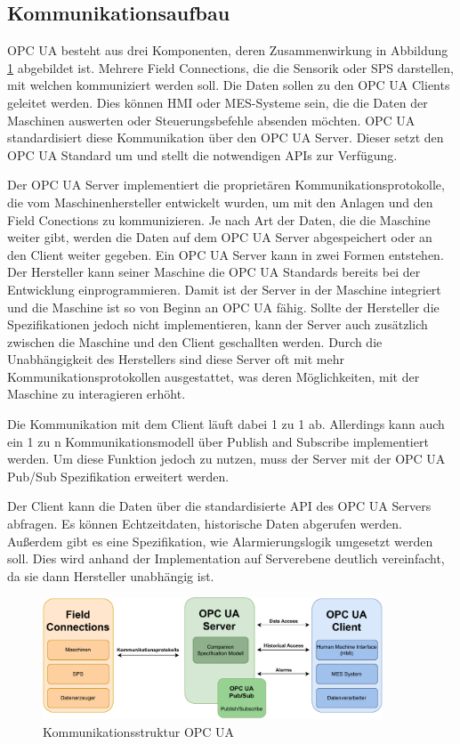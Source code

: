 \documentclass[a4paper, 12pt, oneside]{scrbook}
\begin{document}
		\subsection{Kommunikationsaufbau} 
		
		OPC UA besteht aus drei Komponenten, deren Zusammenwirkung in Abbildung \ref{fig:OPCUA_Structure} abgebildet ist. Mehrere Field Connections, die die Sensorik oder SPS darstellen, mit welchen kommuniziert werden soll. Die Daten sollen zu den OPC UA Clients geleitet werden. Dies können \ac{HMI} oder MES-Systeme sein, die die Daten der Maschinen auswerten oder Steuerungsbefehle absenden möchten. OPC UA standardisiert diese Kommunikation über den OPC UA Server. Dieser setzt den OPC UA Standard um und stellt die notwendigen APIs zur Verfügung. \cite{rinke_was_2022}
		
		Der OPC UA Server implementiert die proprietären Kommunikationsprotokolle, die vom Maschinenhersteller entwickelt wurden, um mit den Anlagen und den Field Conections zu kommunizieren. Je nach Art der Daten, die die Maschine weiter gibt, werden die Daten auf dem OPC UA Server abgespeichert oder an den Client weiter gegeben. Ein OPC UA Server kann in zwei Formen entstehen. Der Hersteller kann seiner Maschine die OPC UA Standards bereits bei der Entwicklung einprogrammieren. Damit ist der Server in der Maschine integriert und die Maschine ist so von Beginn an OPC UA fähig. Sollte der Hersteller die Spezifikationen jedoch nicht implementieren, kann der Server auch zusätzlich zwischen die Maschine und den Client geschallten werden. Durch die Unabhängigkeit des Herstellers sind diese Server oft mit mehr Kommunikationsprotokollen ausgestattet, was deren Möglichkeiten, mit der Maschine zu interagieren erhöht. \cite{rinke_was_2022}
		
		Die Kommunikation mit dem Client läuft dabei 1 zu 1 ab. Allerdings kann auch ein 1 zu n Kommunikationsmodell über Publish and Subscribe implementiert werden. Um diese Funktion jedoch zu nutzen, muss der Server mit der OPC UA Pub/Sub Spezifikation erweitert werden. \cite{mielebacher_verteilte_2021}
		
		Der Client kann die Daten über die standardisierte API des OPC UA Servers abfragen. Es können Echtzeitdaten, historische Daten abgerufen werden. Außerdem gibt es eine Spezifikation, wie Alarmierungslogik umgesetzt werden soll. Dies wird anhand der Implementation auf Serverebene deutlich vereinfacht, da sie dann Hersteller unabhängig ist. \cite{rinke_was_2022}
		
		\begin{figure}[H]
			\centering
			\includegraphics[width=0.9\textwidth]{res/diagramms/OPCUA.pdf}
			\caption{Kommunikationsstruktur OPC UA}
			\label{fig:OPCUA_Structure}
		\end{figure}
	
\end{document}
